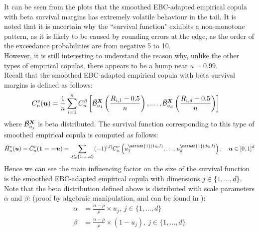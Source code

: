 \documentclass[12pt]{report}
\newcommand{\1}{\mathbf{1}}
\begin{document}
\begin{flushleft}
It can be seen from the plots that the smoothed EBC-adapted empirical copula with beta survival margins has extremely volatile behaviour in the tail. It is noted that it is uncertain why the ``survival function" exhibits a non-monotone pattern, as it is likely to be caused by rounding errors at the edge, as the order of the exceedance probabilities are from negative 5 to 10. \\
\vspace{0.5cm}
However, it is still interesting to understand the reason why, unlike the other types of empirical copulas, there appears to be a hump near $u = 0.99$.\\
\vspace{0.5cm}
Recall that the smoothed EBC-adapted empirical copula with beta survival margins is defined as follows:
\begin{align*}
C_{n}^{v}(\boldsymbol{u}) &= \frac{1}{n} \sum\limits_{i = 1}^{n} C_{n}^{\beta} \left[\Bar{\mathcal{B}}_{u_{1}}^{\boldsymbol{X}}\left(\frac{R_{i,1} - 0.5}{n}\right), \dots, \Bar{\mathcal{B}}_{u_{d}}^{\boldsymbol{X}}\left(\frac{R_{i,d} - 0.5}{n}\right) \right]
\end{align*}
where $\Bar{\mathcal{B}}_{u_{j}}^{\boldsymbol{X}}$ is beta distributed. The survival function corresponding to this type of smoothed empirical copula is computed as follows:
\begin{align*}
\Bar{H}^{v}_{n}(\boldsymbol{u}) = \Bar{C}^{v}_{n}(\boldsymbol{1 -- u}) = \sum\limits_{J \subseteq \{1, \dots, d \} }(-1)^{|J|} C^{v}_{n} \left( u_{1}^{\mathds{1}(1\in J)}, \dots, u_{d}^{\mathds{1}(d\in J)} \right), \quad \boldsymbol{u} \in [0,1]^{d}
\end{align*}
Hence we can see the main influencing factor on the size of the survival function is the smoothed EBC-adapted empirical copula with dimensions $j \in \{1, \dots, d\}$. Note that the beta distribution defined above is distributed with scale parameters $\alpha$ and $\beta$: (proof by algebraic manipulation, and can be found in \cite{KojadinovicYi2024Smooth}):
\begin{align*}
\alpha &= \frac{n - \rho}{\rho} \times u_{j}, \: j \in \{1, \dots, d\} \\
\beta &= \frac{n - \rho}{\rho} \times (1 - u_{j}), \: j \in \{1, \dots, d\}
\end{align*}

\end{flushleft}
\end{document}
